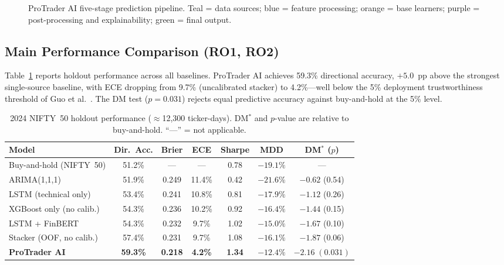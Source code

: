 \documentclass[12pt,a4paper]{article}
\begin{document}
\begin{figure}[h]
{}
\caption{ProTrader AI five-stage prediction pipeline. Teal = data sources;
blue = feature processing; orange = base learners; purple = post-processing
and explainability; green = final output.}
\label{fig:arch}
\end{figure}

\subsection{Main Performance Comparison (RO1, RO2)}

Table~\ref{tab:main} reports holdout performance across all baselines.
ProTrader AI achieves 59.3\% directional accuracy, $+5.0$~pp above the strongest
single-source baseline, with ECE dropping from 9.7\% (uncalibrated stacker)
to 4.2\%---well below the 5\% deployment trustworthiness threshold
of Guo et al.\ \cite{r9}. The DM test ($p=0.031$) rejects equal predictive
accuracy against buy-and-hold at the 5\% level.

\begin{table}[h]
\centering
\caption{2024 NIFTY~50 holdout performance ($\approx$12{,}300 ticker-days).
DM$^*$ and $p$-value are relative to buy-and-hold. ``---'' = not applicable.}
\label{tab:main}
\footnotesize\setlength{\tabcolsep}{3pt}
\begin{tabular}{lcccccc}
\toprule
\textbf{Model} & \textbf{Dir.\ Acc.} & \textbf{Brier} & \textbf{ECE}
  & \textbf{Sharpe} & \textbf{MDD} & \textbf{DM$^*$ ($p$)} \\
\midrule
Buy-and-hold (NIFTY~50)   & 51.2\% & ---   & ---    & 0.78 & $-19.1\%$ & --- \\
ARIMA(1,1,1)               & 51.9\% & 0.249 & 11.4\% & 0.42 & $-21.6\%$ & $-0.62$ (0.54) \\
LSTM (technical only)      & 53.4\% & 0.241 & 10.8\% & 0.81 & $-17.9\%$ & $-1.12$ (0.26) \\
XGBoost only (no calib.)   & 54.3\% & 0.236 & 10.2\% & 0.92 & $-16.4\%$ & $-1.44$ (0.15) \\
LSTM + FinBERT \cite{r5}   & 54.3\% & 0.232 & 9.7\%  & 1.02 & $-15.0\%$ & $-1.67$ (0.10) \\
Stacker (OOF, no calib.)   & 57.4\% & 0.231 & 9.7\%  & 1.08 & $-16.1\%$ & $-1.87$ (0.06) \\
\textbf{ProTrader AI}      & \textbf{59.3\%} & \textbf{0.218} & \textbf{4.2\%}
  & \textbf{1.34} & $\mathbf{-12.4\%}$ & $\mathbf{-2.16\;(0.031)}$ \\
\bottomrule
\end{tabular}
\end{table}
\end{document}
